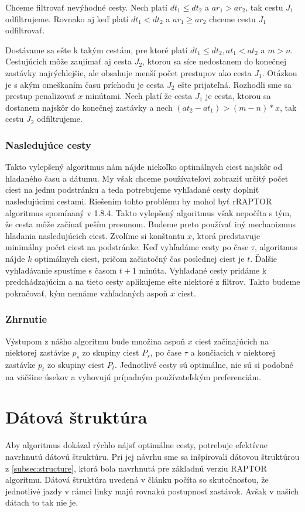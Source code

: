 Chceme filtrovať nevýhodné cesty. Nech platí $dt_1 \leq dt_2$ a $ar_1 > ar_2$, tak cestu $J_1$ odfiltrujeme. Rovnako aj keď platí $dt_1 < dt_2$ a $ar_1 \geq ar_2$ chceme cestu $J_1$ odfiltrovať. 

Dostávame sa ešte k takým cestám, pre ktoré platí $dt_1 \leq dt_2, at_1<at_2$ a $m>n$. Cestujúcich môže zaujímať aj cesta $J_2$, ktorou sa síce nedostanem do konečnej zastávky najrýchlejšie, ale obsahuje menší počet prestupov ako cesta $J_1$. Otázkou je s akým omeškaním času príchodu je cesta $J_2$ ešte prijateľná. Rozhodli sme sa prestup penalizovať $x$ minútami. Nech platí že cesta $J_1$ je cesta, ktorou sa dostanem najskôr do konečnej zastávky a nech $(at_2-at_1) > (m-n) * x$, tak cestu $J_2$ odfiltrujeme.

\subsubsection{Nasledujúce cesty}
Takto vylepšený algoritmus nám nájde niekoľko optimálnych ciest najskôr od hľadaného času a dátumu. My však chceme používateľovi zobraziť určitý počet ciest na jednu podstránku a teda potrebujeme vyhľadané cesty doplniť nasledujúcimi cestami. 
Riešením tohto problému by mohol byť rRAPTOR algoritmus spomínaný v 1.8.4. Takto vylepšený algoritmus však nepočíta s tým, že cesta môže začínať peším presunom. Budeme preto používať iný mechanizmus hľadania nasledujúcich ciest.
Zvolíme si konštantu $x$, ktorá predstavuje minimálny počet ciest na podstránke. Keď vyhľadáme cesty po čase $\tau$, algoritmus nájde $k$ optimálnych ciest, pričom začiatočný čas poslednej ciest je $t$. Ďalšie vyhľadávanie spustíme s časom $t + 1$ minúta. Vyhľadané cesty pridáme k predchádzajúcim a na tieto cesty aplikujeme ešte niektoré z filtrov. Takto budeme pokračovať, kým nemáme vzhľadaných aspoň $x$ ciest.

\subsubsection{Zhrnutie}
Výstupom z nášho algoritmu bude množina aspoň $x$ ciest začínajúcich na niektorej zastávke $p_s$ zo skupiny ciest $P_s$, po čase $\tau$ a končiacich v niektorej zastávke $p_t$ zo skupiny ciest $P_t$. Jednotlivé cesty sú optimálne, nie sú si podobné na väčšine úsekov a vyhovujú prípadným používateľským preferenciám.

\section{Dátová štruktúra}
Aby algoritmus dokázal rýchlo nájsť optimálne cesty, potrebuje efektívne navrhnutú dátovú štruktúru. Pri jej návrhu sme sa inšpirovali dátovou štruktúrou z \ref{subsec:structure}, ktorá bola navrhnutá pre základnú verziu RAPTOR algoritmu. Dátová štruktúra uvedená v článku počíta so skutočnosťou, že jednotlivé jazdy v rámci linky majú rovnakú postupnosť zastávok. Avšak v našich dátach to tak nie je. 

